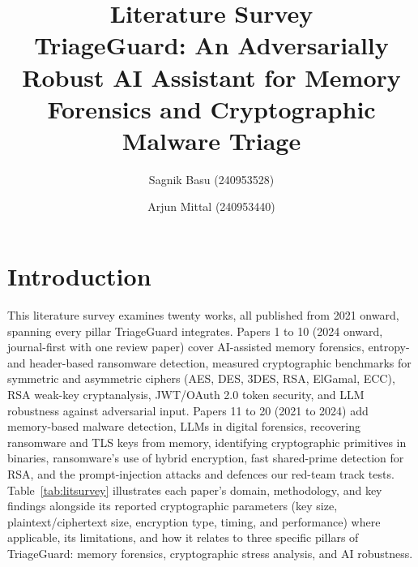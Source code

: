 \documentclass[10pt]{article}
\title{\textbf{Literature Survey}\\[10pt] \large TriageGuard: An Adversarially Robust AI Assistant for Memory Forensics and Cryptographic Malware Triage}
\author{Sagnik Basu (240953528) \and Arjun Mittal (240953440)}
\date{}
\begin{document}
\maketitle

\section*{Introduction}

This literature survey examines twenty works, all published from 2021 onward, spanning every pillar
TriageGuard integrates. Papers 1 to 10 (2024 onward, journal-first with one review paper) cover AI-assisted
memory forensics, entropy- and header-based ransomware detection, measured cryptographic benchmarks for symmetric
and asymmetric ciphers (AES, DES, 3DES, RSA, ElGamal, ECC), RSA weak-key cryptanalysis, JWT/OAuth 2.0 token
security, and LLM robustness against adversarial input. Papers 11 to 20 (2021 to 2024) add memory-based malware
detection, LLMs in digital forensics, recovering ransomware and TLS keys from memory, identifying cryptographic
primitives in binaries, ransomware's use of hybrid encryption, fast shared-prime detection for RSA, and the
prompt-injection attacks and defences our red-team track tests. Table~\ref{tab:litsurvey} illustrates each
paper's domain, methodology, and key findings alongside its reported cryptographic parameters (key size,
plaintext/ciphertext size, encryption type, timing, and performance) where applicable, its limitations, and how
it relates to three specific pillars of TriageGuard: memory forensics, cryptographic stress analysis, and AI
robustness.
\end{document}
